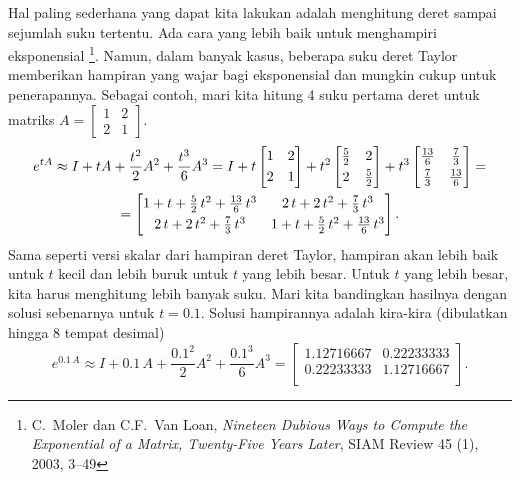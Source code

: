 Hal paling sederhana yang dapat kita lakukan
adalah menghitung deret sampai sejumlah suku tertentu.  Ada
cara yang lebih baik untuk menghampiri eksponensial%
\footnote{C.\ Moler dan C.F.\ Van Loan, \emph{Nineteen Dubious Ways
to Compute the Exponential of a Matrix, Twenty-Five Years Later}, SIAM Review
45 (1), 2003, 3--49}.  Namun, dalam banyak kasus,
beberapa suku deret Taylor memberikan
hampiran yang wajar bagi eksponensial dan mungkin cukup untuk
penerapannya.  Sebagai contoh, mari kita hitung 4 suku pertama
deret untuk matriks $A = 
\left[ \begin{smallmatrix}
1 & 2 \\
2 & 1
\end{smallmatrix} \right]$.
\begin{multline*}
e^{tA}
\approx
I + tA + \frac{t^2}{2}A^2 + \frac{t^3}{6}A^3
=
I + t
\begin{bmatrix}
1 & 2 \\
\noalign{\smallskip}
2 & 1
\end{bmatrix}
+ t^2
\begin{bmatrix}
\frac{5}{2} & 2 \\
\noalign{\smallskip}
2 & \frac{5}{2}
\end{bmatrix}
+ t^3
\begin{bmatrix}
\frac{13}{6} & \frac{7}{3} \\
\noalign{\smallskip}
\frac{7}{3} & \frac{13}{6}
\end{bmatrix}
=
\\
=
\begin{bmatrix}
1 + t + \frac{5}{2}\, t^2 + \frac{13}{6}\, t^3 &
   2\,t + 2\, t^2   + \frac{7}{3}\, t^3 \\
\noalign{\smallskip}
   2\,t + 2\, t^2   + \frac{7}{3}\, t^3 &
1 + t + \frac{5}{2}\, t^2 + \frac{13}{6}\, t^3
\end{bmatrix} .
\end{multline*}
Sama seperti versi skalar dari hampiran deret Taylor,
hampiran akan lebih baik untuk $t$ kecil dan lebih buruk untuk $t$ yang lebih besar.  Untuk
$t$ yang lebih besar, kita harus menghitung lebih banyak suku.
Mari kita bandingkan hasilnya dengan solusi sebenarnya untuk $t=0.1$.  Solusi
hampirannya adalah kira-kira (dibulatkan hingga 8 tempat desimal)
\begin{equation*}
e^{0.1\,A} \approx
I + 0.1\,A + \frac{0.1^2}{2}A^2 + \frac{0.1^3}{6}A^3
=
\begin{bmatrix}
1.12716667 & 0.22233333 \\
0.22233333 & 1.12716667 \\
\end{bmatrix} .
\end{equation*}
